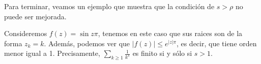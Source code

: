 \documentclass[
]{kaohandt}
\begin{document}
	Para terminar, veamos un ejemplo que muestra que la condición de $s > \rho$ no puede ser mejorada.
	
	\begin{example}
		Consideremos $f(z) = \sin{z\pi}$, tenemos en este caso que sus raices son de la forma $z_k = k$. Además, podemos ver que $|f(z)| \leq e^{|z|\pi}$, es decir, que tiene orden menor igual a 1. Precisamente, $\sum_{k\geq1} \frac{1}{k^s}$ es finito si y sólo si $s > 1.$ 
	\end{example}
\end{document}
